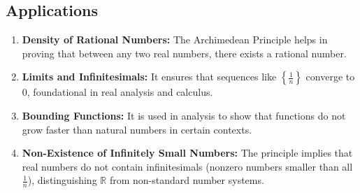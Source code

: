 \subsection{Applications}

\begin{enumerate}
	\item \textbf{Density of Rational Numbers:} The Archimedean Principle helps in proving that between any two real numbers, there exists a rational number.

	\item \textbf{Limits and Infinitesimals:} It ensures that sequences like \( \left\{ \frac{1}{n} \right\} \) converge to 0, foundational in real analysis and calculus.

	\item \textbf{Bounding Functions:} It is used in analysis to show that functions do not grow faster than natural numbers in certain contexts.

	\item \textbf{Non-Existence of Infinitely Small Numbers:} The principle implies that real numbers do not contain infinitesimals (nonzero numbers smaller than all \( \frac{1}{n} \)), distinguishing \( \mathbb{R} \) from non-standard number systems.
\end{enumerate}

\newpage

